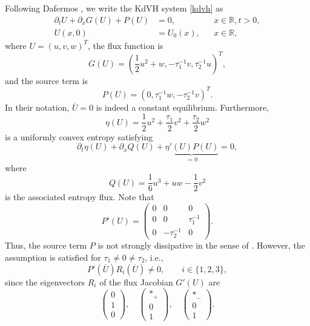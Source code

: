 \documentclass{article}
\theoremstyle{plain}
\theoremstyle{definition}
\numberwithin{theorem}{section}
\begin{document}
Following Dafermos \cite[Section~5.2]{dafermos2010hyperbolic}, we write the KdVH system \eqref{kdvh} as
\begin{equation}\label{eq:kdvh_con}
\begin{aligned}
    \partial_t U + \partial_x G(U) + P(U) &= 0, && x \in \mathbb{R}, t > 0, \\
    U(x, 0) &= U_0(x), && x \in \mathbb{R},
\end{aligned}
\end{equation}
where $U = (u, v, w)^T$, the flux function is
\begin{equation}
    G(U) = \left( \frac{1}{2} u^2 + w, -\tau_1^{-1} v, \tau_2^{-1} u \right)^T,
\end{equation}
and the source term is
\begin{equation}
    P(U) = \left( 0, \tau_1^{-1} w, -\tau_2^{-1} v \right)^T.
\end{equation}
In their notation, $\overline{U} = 0$ is indeed a constant equilibrium.
Furthermore,
\begin{equation}
    \eta(U) = \frac{1}{2} u^2 + \frac{\tau_1}{2} v^2 + \frac{\tau_2}{2} w^2
\end{equation}
is a uniformly convex entropy satisfying
\begin{equation}\label{eq:kdvh_entropyeq}
    \partial_t \eta(U) + \partial_x Q(U) + \underbrace{\eta'(U) P(U)}_{= 0} = 0,
\end{equation}
where
\begin{equation}
    Q(U) = \frac{1}{6} u^3 + u w - \frac{1}{2} v^2
\end{equation}
is the associated entropy flux. Note that
\begin{equation}
    P'(U) = \begin{pmatrix}
        0 & 0 & 0 \\
        0 & 0 & \tau_1^{-1} \\
        0 & -\tau_2^{-1} & 0
    \end{pmatrix}.
\end{equation}
Thus, the source term $P$ is not strongly dissipative in the sense of \cite[Section~5.2, p.~109]{dafermos2010hyperbolic}.
However, the assumption \cite[(5.2.12)]{dafermos2010hyperbolic} is satisfied for $\tau_1 \ne 0 \ne \tau_2$, i.e.,
\begin{equation}
    P'(\overline{U}) R_i(\overline{U}) \ne 0, \qquad i \in \{1, 2, 3\},
\end{equation}
since the eigenvectors $R_i$ of the flux Jacobian $G'(U)$ are \cite{besse2022perfectly}
\begin{equation}
    \begin{pmatrix}
        0 \\ 1 \\ 0
    \end{pmatrix},
    \quad
    \begin{pmatrix}
        *_+ \\ 0 \\ 1
    \end{pmatrix},
    \quad
    \begin{pmatrix}
        *_- \\ 0 \\ 1
    \end{pmatrix}.
\end{equation}
\end{document}
